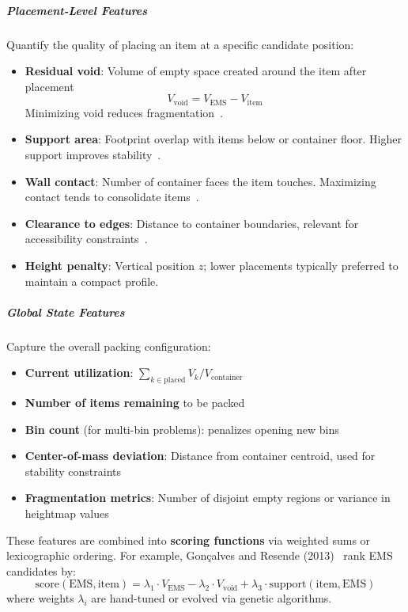 \subparagraph{Placement-Level Features}
Quantify the quality of placing an item at a specific candidate position:
\begin{itemize}
    \item \textbf{Residual void}: Volume of empty space created around the item after placement
    \begin{equation}
    V_{\text{void}} = V_{\text{EMS}} - V_{\text{item}}
    \end{equation}
    Minimizing void reduces fragmentation~\cite{PAVTO08}.

    \item \textbf{Support area}: Footprint overlap with items below or container floor. Higher support improves stability~\cite{GOGL16}.

    \item \textbf{Wall contact}: Number of container faces the item touches. Maximizing contact tends to consolidate items~\cite{CPT08}.

    \item \textbf{Clearance to edges}: Distance to container boundaries, relevant for accessibility constraints~\cite{BTC23}.

    \item \textbf{Height penalty}: Vertical position $z$; lower placements typically preferred to maintain a compact profile.
\end{itemize}

\subparagraph{Global State Features}
Capture the overall packing configuration:
\begin{itemize}
    \item \textbf{Current utilization}: $\sum_{k \in \text{placed}} V_k / V_{\text{container}}$
    \item \textbf{Number of items remaining} to be packed
    \item \textbf{Bin count} (for multi-bin problems): penalizes opening new bins
    \item \textbf{Center-of-mass deviation}: Distance from container centroid, used for stability constraints~\cite{GOGL16}
    \item \textbf{Fragmentation metrics}: Number of disjoint empty regions or variance in heightmap values
\end{itemize}

These features are combined into \textbf{scoring functions} via weighted sums or lexicographic ordering. For example, Gonçalves and Resende (2013)~\cite{GR13} rank EMS candidates by:
\begin{equation}
\text{score}(\text{EMS}, \text{item}) = \lambda_1 \cdot V_{\text{EMS}} - \lambda_2 \cdot V_{\text{void}} + \lambda_3 \cdot \text{support}(\text{item}, \text{EMS})
\end{equation}
where weights $\lambda_i$ are hand-tuned or evolved via genetic algorithms.


